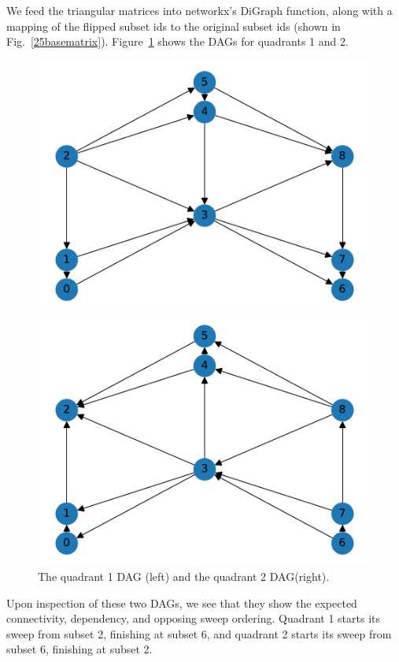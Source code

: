 \documentclass[times,final]{elsarticle}
\begin{document}
We feed the triangular matrices into networkx's DiGraph function, along with a mapping of the flipped subset ids to the original subset ids (shown in Fig.~\ref{25basematrix}). Figure~\ref{25_q1q2graphs} shows the DAGs for quadrants 1 and 2.
\begin{figure}[H]
\begin{minipage}[c]{0.5\textwidth}
\includegraphics[scale=0.5]{../figures/9_graph1.pdf}
\end{minipage}
\begin{minipage}[c]{0.5\textwidth}
\includegraphics[scale=0.5]{../figures/9_graph2.pdf}
\end{minipage}
\caption{The quadrant 1 DAG (left) and the quadrant 2 DAG(right).}
\label{25_q1q2graphs}
\end{figure}
Upon inspection of these two DAGs, we see that they show the expected connectivity, dependency, and opposing sweep ordering.
Quadrant 1 starts its sweep from subset 2, finishing at subset 6, and quadrant 2 starts its sweep from subset 6, finishing at subset 2.
\end{document}
